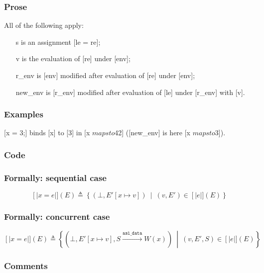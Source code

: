 \documentclass{book}
\newcommand\llbracket{[|}
\newcommand\rrbracket{|]}
\newcommand\interp[1]{\left\llbracket #1 \right\rrbracket}
\newcommand\st[0]{\ \middle|\ }
\newcommand\asldata[0]{\mathtt{asl\_data}}
\begin{document}
  \subsubsection{Prose}
  All of the following apply:
  \begin{itemize}
  \item [s] is an assignment [le = re];
  \item [v] is the evaluation of [re] under [env];
  \item [r\_env] is [env] modified after evaluation of [re] under [env];
  \item [new\_env] is [r\_env] modified after evaluation of [le] under [r\_env] with
    [v].
  \end{itemize}

  \subsubsection{Examples}
  [x = 3;] binds [x] to [3] in [x $mapsto$42] ([new\_env] is here [x $mapsto$3]).

  \subsubsection{Code}

  \subsubsection{Formally: sequential case}
  \begin{equation}
    \interp{x = e} (E) \triangleq
      \left\{ \left(\bot, E'[x \mapsto v ]\right) \st{} (v, E') \in \interp{e} (E) \right\}
    \label{eq:sem-det-sassign}
  \end{equation}

  \subsubsection{Formally: concurrent case}
  \begin{equation}
    \interp{x = e} (E) \triangleq
      \left\{ \left(\bot, E'[x \mapsto v ], S \xrightarrow{\asldata} W(x)\right) \st{}
        (v, E', S) \in \interp{e} (E)
      \right\}
    \label{eq:sem-ndet-sassign}
  \end{equation}

  \subsubsection{Comments}
\end{document}
